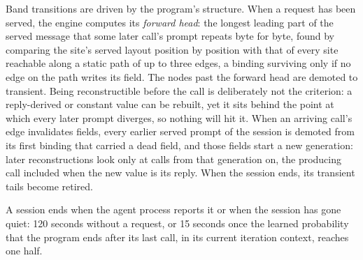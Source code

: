 Band transitions are driven by the program's structure. When a request has been served, the engine computes its \emph{forward head}: the longest leading part of the served message that some later call's prompt repeats byte for byte, found by comparing the site's served layout position by position with that of every site reachable along a static path of up to three edges, a binding surviving only if no edge on the path writes its field. The nodes past the forward head are demoted to transient. Being reconstructible before the call is deliberately not the criterion: a reply-derived or constant value can be rebuilt, yet it sits behind the point at which every later prompt diverges, so nothing will hit it. When an arriving call's edge invalidates fields, every earlier served prompt of the session is demoted from its first binding that carried a dead field, and those fields start a new generation: later reconstructions look only at calls from that generation on, the producing call included when the new value is its reply. When the session ends, its transient tails become retired.

A session ends when the agent process reports it or when the session has gone quiet: 120 seconds without a request, or 15 seconds once the learned probability that the program ends after its last call, in its current iteration context, reaches one half.
